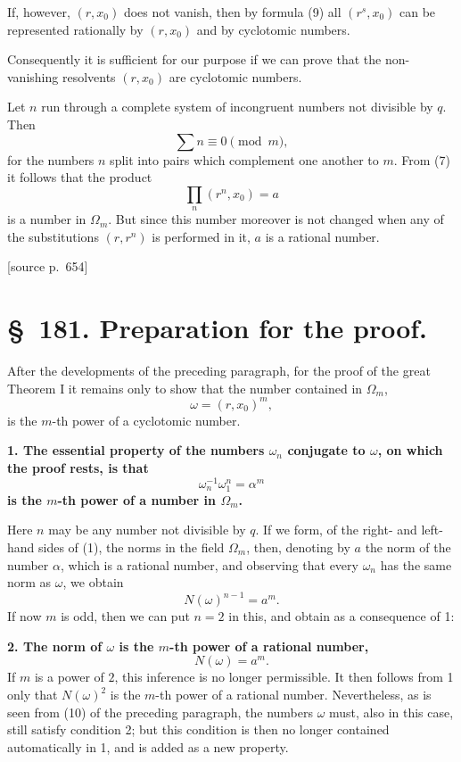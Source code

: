 \documentclass[11pt]{article}
\newcommand{\srcpage}[1]{\par\medskip\noindent\textsf{[source p.~#1]}\par\smallskip}
\begin{document}
If, however, $(r,x_0)$ does not vanish, then by formula (9) all $(r^s,x_0)$ can be represented rationally by $(r,x_0)$ and by cyclotomic numbers.

Consequently it is sufficient for our purpose if we can prove that the non-vanishing resolvents $(r,x_0)$ are cyclotomic numbers.

Let $n$ run through a complete system of incongruent numbers not divisible by $q$. Then
\[
  \sum n\equiv 0\pmod m,
\]
for the numbers $n$ split into pairs which complement one another to $m$. From (7) it follows that the product
\begin{equation}
  \prod_n (r^n,x_0)=a
\tag{10}
\end{equation}
is a number in $\Omega_m$. But since this number moreover is not changed when any of the substitutions $(r,r^n)$ is performed in it, $a$ is a rational number.

\srcpage{654}
\section*{\S~181. Preparation for the proof.}

After the developments of the preceding paragraph, for the proof of the great Theorem I it remains only to show that the number contained in $\Omega_m$,
\[
  \omega=(r,x_0)^m,
\]
is the $m$-th power of a cyclotomic number.

\textbf{1. The essential property of the numbers $\omega_n$ conjugate to $\omega$, on which the proof rests, is that}
\begin{equation}
  \omega_n^{-1}\omega_1^n=\alpha^m
\tag{1}
\end{equation}
\textbf{is the $m$-th power of a number in $\Omega_m$.}

Here $n$ may be any number not divisible by $q$. If we form, of the right- and left-hand sides of (1), the norms in the field $\Omega_m$, then, denoting by $a$ the norm of the number $\alpha$, which is a rational number, and observing that every $\omega_n$ has the same norm as $\omega$, we obtain
\[
  N(\omega)^{n-1}=a^m.
\]
If now $m$ is odd, then we can put $n=2$ in this, and obtain as a consequence of 1:

\textbf{2. The norm of $\omega$ is the $m$-th power of a rational number,}
\begin{equation}
  N(\omega)=a^m.
\tag{2}
\end{equation}
If $m$ is a power of $2$, this inference is no longer permissible. It then follows from 1 only that $N(\omega)^2$ is the $m$-th power of a rational number. Nevertheless, as is seen from (10) of the preceding paragraph, the numbers $\omega$ must, also in this case, still satisfy condition 2; but this condition is then no longer contained automatically in 1, and is added as a new property.
\end{document}
